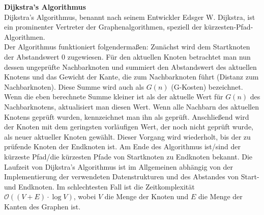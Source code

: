 \textbf{Dijkstra's Algorithmus}\\
Dijkstra's Algorithmus, benannt nach seinem Entwickler Edsger W. Dijkstra, ist ein prominenter Vertreter der Graphenalgorithmen,
speziell der kürzesten-Pfad-Algorithmen. \cite{dijkstra1959}\\
Der Algorithmus funktioniert folgendermaßen: Zunächst wird dem Startknoten der Abstandswert $0$ zugewiesen.
Für den aktuellen Knoten betrachtet man nun dessen ungeprüfte Nachbarknoten und summiert den Abstandswert des aktuellen
Knotens und das Gewicht der Kante, die zum Nachbarknoten führt (Distanz zum Nachbarknoten).
Diese Summe wird auch als $G(n)$ (G-Kosten) bezeichnet.
Wenn die eben berechnete Summe kleiner ist als der aktuelle Wert für $G(n)$ des Nachbarknotens, aktualisiert man diesen Wert.
Wenn alle Nachbarn des aktuellen Knotens geprüft wurden, kennzeichnet man ihn als geprüft.
Anschließend wird der Knoten mit dem geringsten vorläufigen Wert, der noch nicht geprüft wurde, als neuer aktueller Knoten gewählt.
Dieser Vorgang wird wiederholt, bis der zu prüfende Knoten der Endknoten ist.
Am Ende des Algorithmus ist/sind der kürzeste Pfad/die kürzesten Pfade von Startknoten zu Endknoten bekannt.
Die Laufzeit von Dijkstra's Algorithmus ist im Allgemeinen abhängig von der Implementierung der verwendeten Datenstrukturen
und des Abstandes von Start- und Endknoten. \cite{dijkstra1959}
Im schlechtesten Fall ist die Zeitkomplexität $\mathcal{O}((V+E)\cdot\log V)$, wobei $V$ die Menge der Knoten und $E$
die Menge der Kanten des Graphen ist. \cite{cormen2022}\\\\

